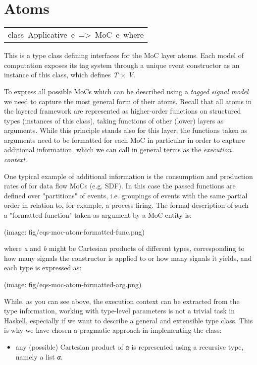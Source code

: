 \section{Atoms}
\begin{haddockdesc}
\item[\begin{tabular}{@{}l}
class\ Applicative\ e\ =>\ MoC\ e\ where
\end{tabular}]\haddockbegindoc
This is a type class defining interfaces for the MoC layer
 atoms. Each model of computation exposes its tag system through a
 unique event constructor as an instance of this class, which
 defines \emph{T} × \emph{V}.\par
 To express all possible MoCs which can be described using
 a \emph{tagged} \emph{signal} \emph{model} we need to capture the most general
 form of their atoms. Recall that all atoms in the layered framework
 are represented as higher-order functions on structured types
 (instances of this class), taking functions of other (lower) layers
 as arguments. While this principle stands also for this layer, the
 functions taken as arguments need to be formatted for each MoC in
 particular in order to capture additional information, which we can
 call in general terms as the \emph{execution context}.\par
One typical example of additional information is the consumption
 and production rates of for data flow MoCs (e.g. SDF). In this case
 the passed functions are defined over "partitions" of events,
 i.e. groupings of events with the same partial order in relation
 to, for example, a process firing. The formal description of such a
 "formatted function" taken as argument by a MoC entity is:\par
(image: fig/eqs-moc-atom-formatted-func.png)\par
where \emph{a} and \emph{b} might be Cartesian products of different types,
 corresponding to how many signals the constructor is applied to or
 how many signals it yields, and each type is expressed as:\par
(image: fig/eqs-moc-atom-formatted-arg.png)\par
While, as you can see above, the execution context can be extracted
 from the type information, working with type-level parameters is
 not a trivial task in Haskell, especially if we want to describe a
 general and extensible type class. This is why we have chosen a
 pragmatic approach in implementing the  class:\par
\begin{itemize}
\item
any (possible) Cartesian product of \emph{α} is represented using
 a recursive type, namely a list {}\emph{α}{}.\par


\end{itemize}
\end{haddockdesc}

